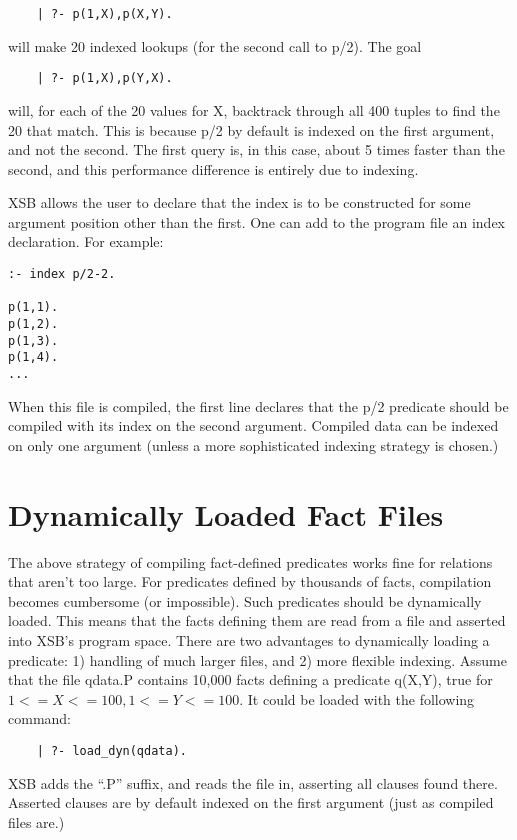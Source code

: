 \begin{verbatim}
	| ?- p(1,X),p(X,Y).
\end{verbatim}
will make 20 indexed lookups (for the second call to p/2).  The goal
\begin{verbatim}
	| ?- p(1,X),p(Y,X).
\end{verbatim}
will, for each of the 20 values for X, backtrack through all 400
tuples to find the 20 that match.  This is because p/2 by default is
indexed on the first argument, and not the second.  The first query
is, in this case, about 5 times faster than the second, and this
performance difference is entirely due to indexing.

XSB allows the user to declare that the index is to be constructed for
some argument position other than the first.  One can add to the
program file an index declaration.  For example:

\begin{verbatim}
:- index p/2-2.

p(1,1).
p(1,2).
p(1,3).
p(1,4).
...
\end{verbatim}

When this file is compiled, the first line declares that the p/2
predicate should be compiled with its index on the second argument.
Compiled data can be indexed on only one argument (unless a more
sophisticated indexing strategy is chosen.)

\section{Dynamically Loaded Fact Files}

The above strategy of compiling fact-defined predicates works fine for 
relations that aren't too large.  For predicates defined by thousands
of facts, compilation becomes cumbersome (or impossible).  Such
predicates should be dynamically loaded.  This means that the facts
defining them are read from a file and asserted into XSB's program
space.  There are two advantages to dynamically loading a predicate:
1) handling of much larger files, and 2) more flexible indexing.
Assume that the file qdata.P contains 10,000 facts defining a
predicate q(X,Y), true for $1<=X<=100, 1<=Y<=100$.  It could be loaded
with the following command:

\begin{verbatim}
	| ?- load_dyn(qdata).
\end{verbatim}

XSB adds the ``.P'' suffix, and reads the file in, asserting all
clauses found there.  Asserted clauses are by default indexed on the
first argument (just as compiled files are.)

